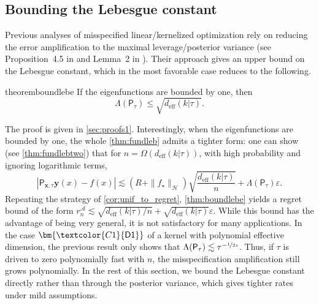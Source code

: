 \documentclass{article}
\let\cite\citep
\numberwithin{theorem}{section}
\theoremstyle{definition}
\newcommand{\fwithin}{f_\star}
\newcommand{\Hs}{\mathcal H}
\newcommand{\defeff}{\bm{\textcolor{C1}{\mathsf{D1}}}}
\begin{document}
\subsection{Bounding the Lebesgue constant}\label{sec:lebe}

Previous analyses of misspecified linear/kernelized optimization rely on reducing the error amplification to the maximal leverage/posterior variance (see Proposition~4.5 in \cite{lattimore2020learning} and Lemma~2 in \cite{bogunovic2021misspecified}). Their approach gives an upper bound on the Lebesgue constant, which in the most favorable case reduces to the following.
\begin{restatable}{theorem}{boundlebe}\label{thm:boundlebe}
    If the eigenfunctions are bounded by one, then $$\Lambda(\mathsf{P}_{\tau})\le \sqrt{ d_\text{eff}(k|\tau)}.$$
\end{restatable}
The proof is given in \cref{sec:proofs1}.
Interestingly,
when the eigenfunctions are bounded by one, the whole \cref{thm:fundleb} admits a tighter form: one can show (see \cref{thm:fundlebtwo}) that for $n=\Omega(d_\text{eff}(k|\tau))$, with high probability and ignoring logarithmic terms,
\begin{equation}|\mathsf{P}_{\bm x,\tau}\bm y(x)-f(x)|\lesssim (R+\|\fwithin\|_\Hs)\sqrt{ \frac{d_\text{eff}(k|\tau)}{n}}+\Lambda(\mathsf{P}_{\tau})\varepsilon.\label{eq:refinederr}
\end{equation}
Repeating the strategy of \cref{cor:unif_to_regret}, \cref{thm:boundlebe} yields a regret bound of the form $r_n^{\mathscr A}\lesssim \sqrt{ d_\text{eff}(k|\tau)/n}+\sqrt{ d_\text{eff}(k|\tau)}\varepsilon$.
While this bound has the advantage of being very general, it is not satisfactory for many applications. In the case $\defeff$ of a kernel with polynomial effective dimension, the previous result only shows that $\Lambda(\mathsf{P}_{\tau})\lesssim \tau^{-\nicefrac{1}{2s}}$. Thus, if $\tau$ is driven to zero polynomially fast with $n$, the misspecification amplification still grows polynomially. In the rest of this section, we bound the Lebesgue constant directly rather than through the posterior variance, which gives tighter rates under mild assumptions.
\end{document}
